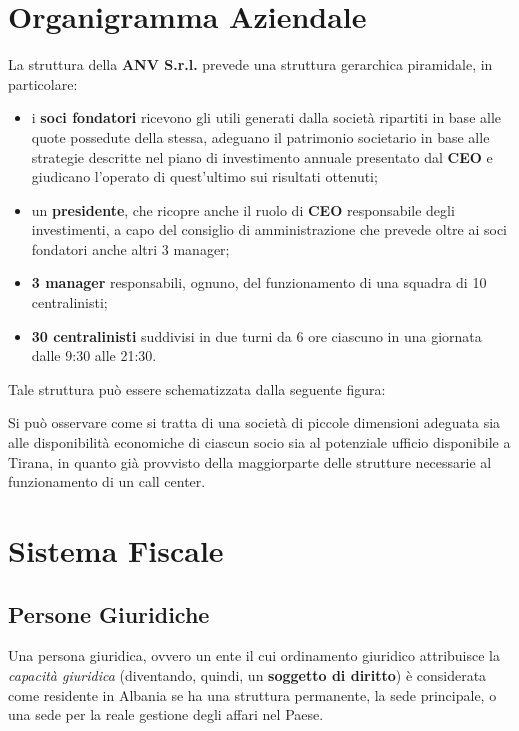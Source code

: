 \section[Organigramma Aziendale]{Organigramma Aziendale}
La struttura della\textbf{ \ac{ANV S.r.l.}} prevede una struttura gerarchica piramidale, in particolare:
\begin{itemize}

 	\item i \textbf{soci fondatori} ricevono gli utili generati dalla società ripartiti in base alle quote possedute della stessa, adeguano il patrimonio societario in base alle strategie descritte nel piano di investimento annuale presentato dal \textbf{\ac{CEO}} e giudicano l'operato di quest'ultimo sui risultati ottenuti; 
 	
	\item un \textbf{presidente}, che ricopre anche il ruolo di \textbf{\ac{CEO}} responsabile degli investimenti, a capo del consiglio di amministrazione che prevede oltre ai soci fondatori anche altri 3 manager;
	
	\item \textbf{3 manager} responsabili, ognuno, del funzionamento di una squadra di 10 centralinisti;
	
	\item \textbf{30 centralinisti} suddivisi in due turni da 6 ore ciascuno in una giornata dalle 9:30 alle 21:30. 

\end{itemize}  

Tale struttura può essere schematizzata dalla seguente figura:
\newline


Si può osservare come si tratta di una società di piccole dimensioni adeguata sia alle disponibilità economiche di ciascun socio sia al potenziale ufficio disponibile a Tirana, in quanto già provvisto della maggiorparte delle strutture necessarie al funzionamento di un call center.

\section[Sistema Fiscale]{Sistema Fiscale}
  
\subsection[Persone Giuridiche]{Persone Giuridiche}
Una persona giuridica, ovvero un ente il cui ordinamento giuridico attribuisce la \textit{capacità giuridica} (diventando, quindi, un \textbf{soggetto di diritto}) è considerata come residente in Albania se ha una struttura permanente, la sede principale, o una sede per la reale gestione degli affari nel Paese.
